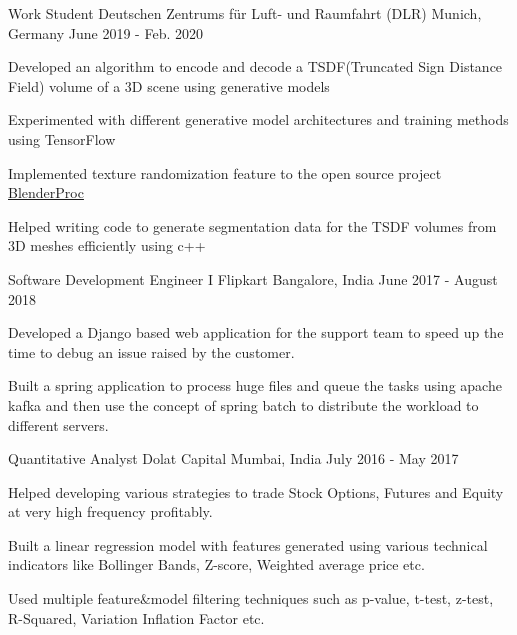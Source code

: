 
\begin{cventries}
  \cventry
    {Work Student} %
    {Deutschen Zentrums für Luft- und Raumfahrt (DLR)} %
    {Munich, Germany} %
    {June 2019 - Feb. 2020} %
    {
      \begin{cvitems} %
        \item {Developed an algorithm to encode and decode a TSDF(Truncated Sign Distance Field) volume of a 3D scene using generative models}
        \item {Experimented with different generative model architectures and training methods using TensorFlow}
        \item {Implemented texture randomization feature to the open source project \href{https://github.com/DLR-RM/BlenderProc}{BlenderProc}}
        \item {Helped writing code to generate segmentation data for the TSDF volumes from 3D meshes efficiently using c++}
      \end{cvitems}
    }

  \cventry
    {Software Development Engineer I} %
    {Flipkart} %
    {Bangalore, India} %
    {June 2017 - August 2018} %
    {
      \begin{cvitems} %
        \item {Developed a Django based web application for the support team to speed up the time to debug an issue raised by the customer.}
        \item {Built a spring application to process huge files and queue the tasks using apache kafka and then use the concept of spring batch to distribute the workload to different servers.}
      \end{cvitems}
    }

  \cventry
    {Quantitative Analyst} %
    {Dolat Capital} %
    {Mumbai, India} %
    {July 2016 - May 2017} %
    {
      \begin{cvitems} %
        \item {Helped developing various strategies to trade Stock Options, Futures and Equity at very high frequency profitably.}
        \item {Built a linear regression model with features generated using various technical indicators like Bollinger Bands, Z-score, Weighted average price etc.}
        \item {Used multiple feature\&model filtering techniques such as p-value, t-test, z-test, R-Squared, Variation Inflation Factor etc.}
      \end{cvitems}
    }


\end{cventries}
